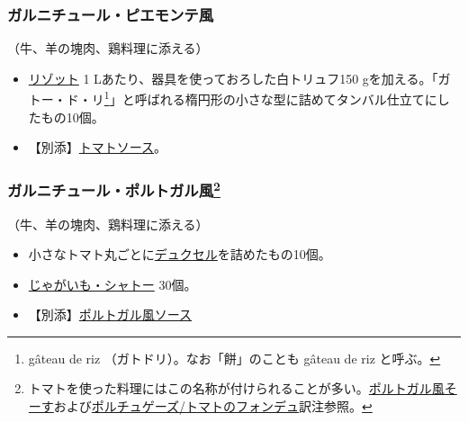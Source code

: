 \begin{recette}
\atoaki{}

\hypertarget{garniture-a-la-piemontaise}{%
\subsubsection{ガルニチュール・ピエモンテ風}\label{garniture-a-la-piemontaise}}



（牛、羊の塊肉、鶏料理に添える）

\begin{itemize}
\item
  \protect\hyperlink{rizotto-a-la-piemontaise}{リゾット} 1
  Lあたり、器具を使っておろした白トリュフ150
  gを加える。「ガトー・ド・リ\footnote{gâteau de riz
    （ガトドリ）。なお「餅」のことも gâteau de riz と呼ぶ。}」と呼ばれる楕円形の小さな型に詰めてタンバル仕立てにしたもの10個。
\item
  【別添】\protect\hyperlink{sauce-tomate}{トマトソース}。
\end{itemize}

\atoaki{}

\hypertarget{garniture-a-la-portugaise}{%
\subsubsection[ガルニチュール・ポルトガル風]{\texorpdfstring{ガルニチュール・ポルトガル風\footnote{トマトを使った料理にはこの名称が付けられることが多い。\protect\hyperlink{sauce-portugaise}{ポルトガル風そーす}および\protect\hyperlink{portugaise}{ポルチュゲーズ/トマトのフォンデュ}訳注参照。}}{ガルニチュール・ポルトガル風}}\label{garniture-a-la-portugaise}}



（牛、羊の塊肉、鶏料理に添える）

\begin{itemize}
\item
  小さなトマト丸ごとに\protect\hyperlink{duxelles-seche}{デュクセル}を詰めたもの10個。
\item
  \protect\hyperlink{pommes-de-terre-chateau}{じゃがいも・シャトー}
  30個。
\item
  【別添】\protect\hyperlink{sauce-portugaise}{ポルトガル風ソース}
\end{itemize}


\end{recette}
